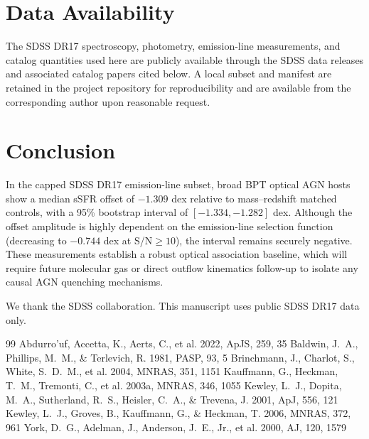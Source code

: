 \documentclass[twocolumn]{aastex631}
\begin{document}
\section{Data Availability}\label{sec:data-avail}
The SDSS DR17 spectroscopy, photometry, emission-line measurements, and catalog quantities used here are publicly available through the SDSS data releases and associated catalog papers cited below. A local subset and manifest are retained in the project repository for reproducibility and are available from the corresponding author upon reasonable request.

\section{Conclusion}\label{sec:conclusion}
In the capped SDSS DR17 emission-line subset, broad BPT optical AGN hosts show a median sSFR offset of $-1.309$ dex relative to mass--redshift matched controls, with a 95\% bootstrap interval of $[-1.334,-1.282]$ dex. Although the offset amplitude is highly dependent on the emission-line selection function (decreasing to $-0.744$ dex at S/N$\geq 10$), the interval remains securely negative. These measurements establish a robust optical association baseline, which will require future molecular gas or direct outflow kinematics follow-up to isolate any causal AGN quenching mechanisms.

\begin{acknowledgments}
We thank the SDSS collaboration. This manuscript uses public SDSS DR17 data only.
\end{acknowledgments}
\begin{thebibliography}{99}
 Abdurro'uf, Accetta, K., Aerts, C., et al. 2022, ApJS, 259, 35
 Baldwin, J.~A., Phillips, M.~M., \& Terlevich, R. 1981, PASP, 93, 5
 Brinchmann, J., Charlot, S., White, S.~D.~M., et al. 2004, MNRAS, 351, 1151
 Kauffmann, G., Heckman, T.~M., Tremonti, C., et al. 2003a, MNRAS, 346, 1055
 Kewley, L.~J., Dopita, M.~A., Sutherland, R.~S., Heisler, C.~A., \& Trevena, J. 2001, ApJ, 556, 121
 Kewley, L.~J., Groves, B., Kauffmann, G., \& Heckman, T. 2006, MNRAS, 372, 961
 York, D.~G., Adelman, J., Anderson, J.~E., Jr., et al. 2000, AJ, 120, 1579

\end{thebibliography}
\end{document}
